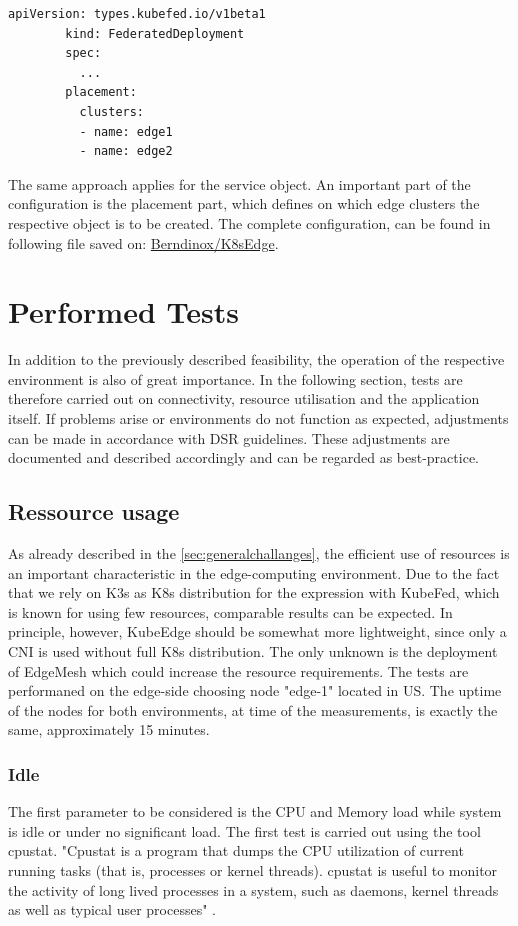 \documentclass[MSC,Master,english]{twbook}%
\begin{document}
\begin{enumerate}
    \begin{lstlisting}[float,caption={Federated Object},captionpos=b]
        apiVersion: types.kubefed.io/v1beta1
        kind: FederatedDeployment
        spec:
          ...
        placement:
          clusters:
          - name: edge1
          - name: edge2
    \end{lstlisting}
    The same approach applies for the service object. An important part of the configuration is the placement part, which defines on which edge clusters the respective object is to be created. The complete configuration, can be found in following file saved on: \hyperref{https://github.com/Berndinox/K8sEdge/blob/main/DOCs/kubefed-usecase1.md}{}{}{Berndinox/K8sEdge}.
\end{enumerate}

\section{Performed Tests}
\label{sec:dsrtest}
In addition to the previously described feasibility, the operation of the respective environment is also of great importance. In the following section, tests are therefore carried out on connectivity, resource utilisation and the application itself. If problems arise or environments do not function as expected, adjustments can be made in accordance with DSR guidelines. These adjustments are documented and described accordingly and can be regarded as best-practice.
\subsection{Ressource usage}
\label{sec:dsrtestress}
As already described in the \autoref{sec:generalchallanges}, the efficient use of resources is an important characteristic in the edge-computing environment. Due to the fact that we rely on K3s as \ac{K8s} distribution for the expression with KubeFed, which is known for using few resources, comparable results can be expected. In principle, however, KubeEdge should be somewhat more lightweight, since only a \ac{CNI} is used without full \ac{K8s} distribution. The only unknown is the deployment of EdgeMesh which could increase the resource requirements. The tests are performaned on the edge-side choosing node "edge-1" located in US. The uptime of the nodes for both environments, at time of the measurements, is exactly the same, approximately 15 minutes.

\subsubsection{Idle}
The first parameter to be considered is the CPU and Memory load while system is idle or under no significant load. The first test is carried out using the tool cpustat. "Cpustat  is  a  program  that dumps the CPU utilization of current running tasks (that is, processes or kernel threads).  cpustat is useful to monitor the  activity  of  long  lived processes in a system, such as daemons, kernel threads as well as typical user processes" \cite{cpustat}. \medbreak
\end{document}
